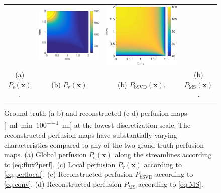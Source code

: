 \documentclass[final,5p,times,twocolumn]{elsarticle}
\begin{document}
\begin{figure}[h!tb]
\begin{tabular}{c c c c}
		& \includegraphics[width=\fwd]{figs/E110_CBFOnDifferentResolutions_plot-bSVD-scaleto-none-raw.eps}
		& \includegraphics[width=\fwd]{figs/E110_CBFOnDifferentResolutions_plot-MS-scaleto-none-raw.eps}\\
		(a) $P_{\mathrm{s}}(\mathbf{x})$. & (b) $P_{\mathrm{v}}(\mathbf{x})$ & (b) $P_{\mathrm{bSVD}}(\mathbf{x})$. & (b) $P_{\mathrm{MS}}(\mathbf{x})$.
	\end{tabular}
	\caption{Ground truth (a-b) and reconstructed (c-d) perfusion maps [\SI{}{\milli\litre\per\minute\per 100\milli\litre}] at the lowest discretization scale. The reconstructed perfusion maps have substantially varying characteristics compared to any of the two grond truth perfusion maps. (a) Global perfusion $P_{\mathrm{s}}(\mathbf{x})$ along the streamlines according to \eqref{eq:flux2perf}. (c) Local perfusion $P_{\mathrm{v}}(\mathbf{x})$ according to \eqref{eq:perflocal}. (c) Reconstructed perfusion $P_{\mathrm{bSVD}}$ according to \eqref{eq:conv}. (d) Reconstructed perfusion $P_{\mathrm{MS}}$ according to \eqref{eq:MS}.} 
        \label{fig:perfusionmaps}
\end{figure}	
\end{document}
